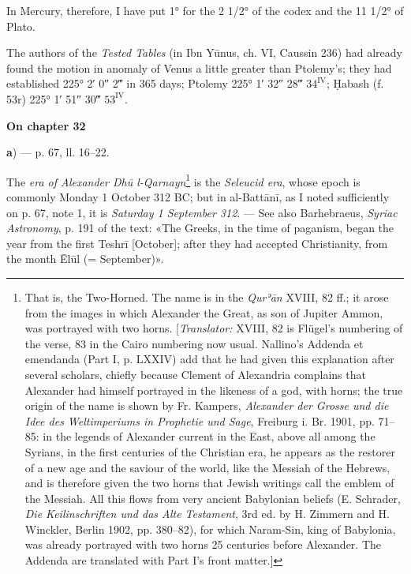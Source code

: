 \documentclass[11pt]{article}
\newcommand{\UnitHead}[2]{\par\setcounter{footnoteT}{0}\needspace{8\baselineskip}\bigskip\pdfbookmark[1]{#1}{unit-#2}\hypertarget{EN-#2}{}%
 {\large\bfseries\interlinepenalty=10000 #1\par}\nobreak\medskip}
\begin{document}
\par In Mercury, therefore, I have put 1° for the 2 1/2° of the codex and the 11 1/2° of Plato.\par
\par The authors of the \emph{Tested Tables} (in Ibn Yūnus, ch. VI, Caussin 236) had already found the motion in anomaly of Venus a little greater than Ptolemy's; they had established 225° 2′ 0″ 2‴ in 365 days; Ptolemy 225° 1′ 32″ 28‴ $34^{\mathrm{IV}}$; Ḥabash (f. 53r) 225° 1′ 51″ 30‴ $53^{\mathrm{IV}}$.\par
\UnitHead{On chapter 32}{A32}
\par\begin{center}\textbf{a}) — p. 67, ll. 16–22.\end{center}
\par The \emph{era of Alexander Dhū l-Qarnayn}\footnote{That is, the Two-Horned. The name is in the \emph{Qurʾān} XVIII, 82 ff.; it arose from the images in which Alexander the Great, as son of Jupiter Ammon, was portrayed with two horns. [\emph{Translator:} XVIII, 82 is Flügel's numbering of the verse, 83 in the Cairo numbering now usual. Nallino's Addenda et emendanda (Part I, p. LXXIV) add that he had given this explanation after several scholars, chiefly because Clement of Alexandria complains that Alexander had himself portrayed in the likeness of a god, with horns; the true origin of the name is shown by Fr. Kampers, \emph{Alexander der Grosse und die Idee des Weltimperiums in Prophetie und Sage}, Freiburg i. Br. 1901, pp. 71–85: in the legends of Alexander current in the East, above all among the Syrians, in the first centuries of the Christian era, he appears as the restorer of a new age and the saviour of the world, like the Messiah of the Hebrews, and is therefore given the two horns that Jewish writings call the emblem of the Messiah. All this flows from very ancient Babylonian beliefs (E. Schrader, \emph{Die Keilinschriften und das Alte Testament}, 3rd ed. by H. Zimmern and H. Winckler, Berlin 1902, pp. 380–82), for which Naram-Sin, king of Babylonia, was already portrayed with two horns 25 centuries before Alexander. The Addenda are translated with Part I's front matter.]} is the \emph{Seleucid era}, whose epoch is commonly Monday 1 October 312 BC; but in al-Battānī, as I noted sufficiently on p. 67, note 1, it is \emph{Saturday 1 September 312}. — See also Barhebraeus, \emph{Syriac Astronomy}, p. 191 of the text: «The Greeks, in the time of paganism, began the year from the first Teshrī [October]; after they had accepted Christianity, from the month Ēlūl (= September)».\par
\end{document}
